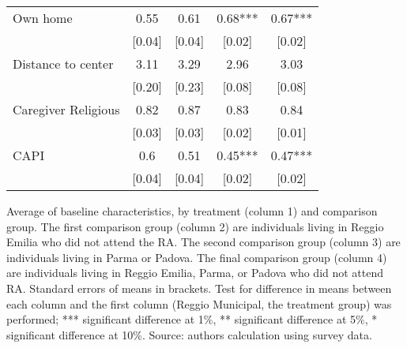 \begin{table}[H]
\begin{tabular}{l cccc}
Own home  & 0.55 & 0.61 & 0.68*** & 0.67*** \\
 & [0.04] & [0.04] & [0.02] & [0.02] \\
Distance to center  & 3.11 & 3.29 & 2.96 & 3.03 \\
 & [0.20] & [0.23] & [0.08] & [0.08] \\
Caregiver Religious & 0.82 & 0.87 & 0.83 & 0.84 \\
 & [0.03] & [0.03] & [0.02] & [0.01] \\
CAPI  & 0.6 & 0.51 & 0.45*** & 0.47*** \\
 & [0.04] & [0.04] & [0.02] & [0.02] \\
\hline
\end{tabular}
\vspace{1ex}

\raggedright{
\footnotesize{Average of baseline characteristics, by treatment (column 1) and comparison group.
The first comparison group (column 2) are individuals living in Reggio Emilia who did not attend the RA. The second comparison group (column 3) are individuals living in Parma or Padova. The final comparison group (column 4) are individuals living in Reggio Emilia, Parma, or Padova who did not attend RA.
Standard errors of means in brackets. Test for difference in means between each column and the first column (Reggio Municipal, the treatment group) was performed; *** significant difference at 1\%, ** significant difference at 5\%, * significant difference at 10\%. Source: authors calculation using survey data.}
}
\end{table}
